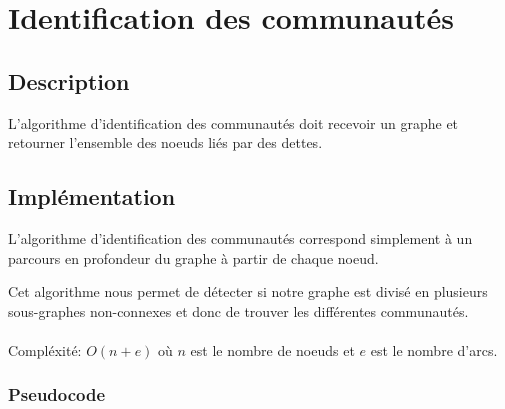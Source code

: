 \documentclass[12pt, oneside]{article}
\begin{document}
\FloatBarrier
\section{Identification des communautés}

\subsection{Description}
L'algorithme d'identification des communautés doit recevoir un graphe et retourner l'ensemble des noeuds liés par des dettes.
\subsection{Implémentation}

L'algorithme d'identification des communautés correspond simplement à un parcours en profondeur du graphe à partir de chaque noeud.

Cet algorithme nous permet de détecter si notre graphe est divisé en plusieurs sous-graphes non-connexes et donc de trouver les différentes communautés.\\\\
Compléxité: $O(n+e)$ où $n$ est le nombre de noeuds et $e$ est le nombre d'arcs.
\subsubsection{Pseudocode}
\begin{algorithm}
\end{algorithm}
 
\begin{algorithm}
\end{algorithm}
\newpage
\end{document}
